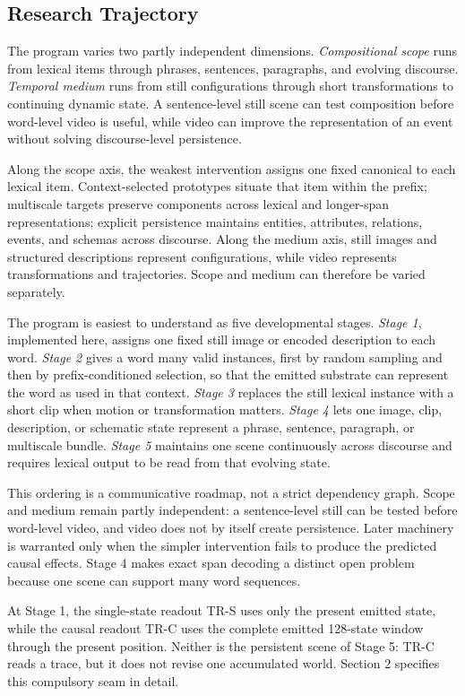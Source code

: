 \documentclass[11pt,a4paper]{article}
\begin{document}
\subsection{Research Trajectory}

The program varies two partly independent dimensions. \emph{Compositional scope} runs from lexical items through phrases, sentences, paragraphs, and evolving discourse. \emph{Temporal medium} runs from still configurations through short transformations to continuing dynamic state. A sentence-level still scene can test composition before word-level video is useful, while video can improve the representation of an event without solving discourse-level persistence.

Along the scope axis, the weakest intervention assigns one fixed canonical to each lexical item. Context-selected prototypes situate that item within the prefix; multiscale targets preserve components across lexical and longer-span representations; explicit persistence maintains entities, attributes, relations, events, and schemas across discourse. Along the medium axis, still images and structured descriptions represent configurations, while video represents transformations and trajectories. Scope and medium can therefore be varied separately.

The program is easiest to understand as five developmental stages. \emph{Stage 1}, implemented here, assigns one fixed still image or encoded description to each word. \emph{Stage 2} gives a word many valid instances, first by random sampling and then by prefix-conditioned selection, so that the emitted substrate can represent the word as used in that context. \emph{Stage 3} replaces the still lexical instance with a short clip when motion or transformation matters. \emph{Stage 4} lets one image, clip, description, or schematic state represent a phrase, sentence, paragraph, or multiscale bundle. \emph{Stage 5} maintains one scene continuously across discourse and requires lexical output to be read from that evolving state.

This ordering is a communicative roadmap, not a strict dependency graph. Scope and medium remain partly independent: a sentence-level still can be tested before word-level video, and video does not by itself create persistence. Later machinery is warranted only when the simpler intervention fails to produce the predicted causal effects. Stage 4 makes exact span decoding a distinct open problem because one scene can support many word sequences.

At Stage 1, the single-state readout TR-S uses only the present emitted state, while the causal readout TR-C uses the complete emitted 128-state window through the present position. Neither is the persistent scene of Stage 5: TR-C reads a trace, but it does not revise one accumulated world. Section 2 specifies this compulsory seam in detail.
\end{document}
